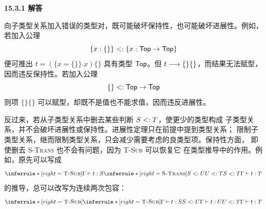 \begin{taplauthorsolutionentrybox}
\label{sol:author:15.3.1}
\textbf{15.3.1 解答}

向子类型关系加入错误的类型对，既可能破坏保持性，也可能破坏进展性。例如，
若加入公理
\[
  \{x:\{\}\}\mathrel{<:}\{x:\mathsf{Top}\to\mathsf{Top}\}
\]
便可推出 \(t=(\{x=\{\}\}.x)\{\}\) 具有类型 \(\mathsf{Top}\)。但
\(t\mathrel{\longrightarrow}\{\}\{\}\)，而结果无法赋型，因而违反保持性。若加入公理
\[
  \{\}\mathrel{<:}\mathsf{Top}\to\mathsf{Top}
\]
则项 \(\{\}\{\}\) 可以赋型，却既不是值也不能求值，因而违反进展性。

反过来，若从子类型关系中删去某些判断 \(S\mathrel{<:} T\)，使更少的类型构成
子类型关系，并不会破坏进展性或保持性。进展性定理只在前提中提到类型关系；
限制子类型关系，继而限制类型关系，只会减少需要考虑的良类型项。保持性方面，
即使删去 \textsc{S-Trans} 也不会有问题，因为 \textsc{T-Sub} 可以恢复它
在类型推导中的作用。例如，原先可以写成
\[
\inferrule*[right=\textsc{T-Sub}]
 {\Gamma\vdash t:S
  \\
  \inferrule*[right=\textsc{S-Trans}]
   {S\subtype U\\U\subtype T}{S\subtype T}}
 {\Gamma\vdash t:T}
\]
的推导，总可以改写为连续两次包容：
\[
\inferrule*[right=\textsc{T-Sub}]
 {\inferrule*[right=\textsc{T-Sub}]
   {\Gamma\vdash t:S\\S\subtype U}{\Gamma\vdash t:U}
  \\
  U\subtype T}
 {\Gamma\vdash t:T}
\]

\end{taplauthorsolutionentrybox}

